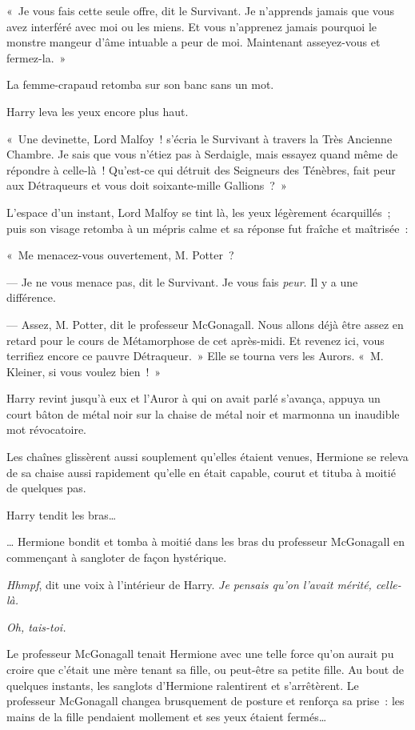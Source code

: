 «~Je vous fais cette seule offre, dit le Survivant. Je n'apprends jamais que vous avez interféré avec moi ou les miens. Et vous n'apprenez jamais pourquoi le monstre mangeur d'âme intuable a peur de moi. Maintenant asseyez-vous et fermez-la.~»

La femme-crapaud retomba sur son banc sans un mot.

Harry leva les yeux encore plus haut.

«~Une devinette, Lord Malfoy~! s'écria le Survivant à travers la Très Ancienne Chambre. Je sais que vous n'étiez pas à Serdaigle, mais essayez quand même de répondre à celle-là~! Qu'est-ce qui détruit des Seigneurs des Ténèbres, fait peur aux Détraqueurs et vous doit soixante-mille Gallions~?~»

L'espace d'un instant, Lord Malfoy se tint là, les yeux légèrement écarquillés~; puis son visage retomba à un mépris calme et sa réponse fut fraîche et maîtrisée~:

«~Me menacez-vous ouvertement, M. Potter~?

--- Je ne vous menace pas, dit le Survivant. Je vous fais \emph{peur}. Il y a une différence.

--- Assez, M. Potter, dit le professeur McGonagall. Nous allons déjà être assez en retard pour le cours de Métamorphose de cet après-midi. Et revenez ici, vous terrifiez encore ce pauvre Détraqueur.~» Elle se tourna vers les Aurors. «~M. Kleiner, si vous voulez bien~!~»

Harry revint jusqu'à eux et l'Auror à qui on avait parlé s'avança, appuya un court bâton de métal noir sur la chaise de métal noir et marmonna un inaudible mot révocatoire.

Les chaînes glissèrent aussi souplement qu'elles étaient venues, Hermione se releva de sa chaise aussi rapidement qu'elle en était capable, courut et tituba à moitié de quelques pas.

Harry tendit les bras…

… Hermione bondit et tomba à moitié dans les bras du professeur McGonagall en commençant à sangloter de façon hystérique.

\emph{Hhmpf}, dit une voix à l'intérieur de Harry. \emph{Je pensais qu'on l'avait mérité, celle-là.}

\emph{Oh, tais-toi.}

Le professeur McGonagall tenait Hermione avec une telle force qu'on aurait pu croire que c'était une mère tenant sa fille, ou peut-être sa petite fille. Au bout de quelques instants, les sanglots d'Hermione ralentirent et s'arrêtèrent. Le professeur McGonagall changea brusquement de posture et renforça sa prise~: les mains de la fille pendaient mollement et ses yeux étaient fermés…

